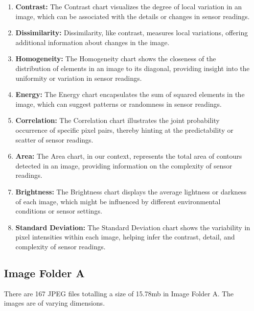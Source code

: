 \begin{enumerate}
\begin{enumerate}
              \item \textbf{Contrast:} The Contrast chart visualizes the degree of local variation in an image, which can be associated with the details or changes in sensor readings.
              \item \textbf{Dissimilarity:} Dissimilarity, like contrast, measures local variations, offering additional information about changes in the image.
              \item \textbf{Homogeneity:} The Homogeneity chart shows the closeness of the distribution of elements in an image to its diagonal, providing insight into the uniformity or variation in sensor readings.
              \item \textbf{Energy:} The Energy chart encapsulates the sum of squared elements in the image, which can suggest patterns or randomness in sensor readings.
              \item \textbf{Correlation:} The Correlation chart illustrates the joint probability occurrence of specific pixel pairs, thereby hinting at the predictability or scatter of sensor readings.
              \item \textbf{Area:} The Area chart, in our context, represents the total area of contours detected in an image, providing information on the complexity of sensor readings.
              \item \textbf{Brightness:} The Brightness chart displays the average lightness or darkness of each image, which might be influenced by different environmental conditions or sensor settings.
              \item \textbf{Standard Deviation:} The Standard Deviation chart shows the variability in pixel intensities within each image, helping infer the contrast, detail, and complexity of sensor readings.
          \end{enumerate}


\end{enumerate}

\newpage

\subsection{Image Folder A}

There are 167 JPEG files totalling a size of 15.78mb in Image Folder A. The images are of varying dimensions.

